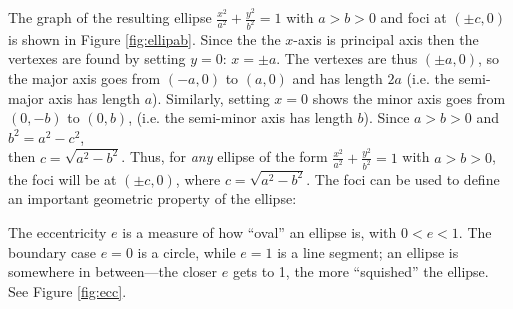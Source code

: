 \piccaption[]{\label{fig:ellipab}}
The graph of the resulting ellipse $\frac{x^2}{a^2} + \frac{y^2}{b^2} = 1$ with
$a>b>0$ and foci at $(\pm c,0)$ is shown in Figure \ref{fig:ellipab}. Since the
the $x$-axis is principal axis then the vertexes are found by setting $y=0$:
$x=\pm a$. The vertexes are thus $(\pm a,0)$, so the major axis goes from
$(-a,0)$ to $(a,0)$ and has length $2a$ (i.e. the semi-major axis has length
$a$). Similarly, setting $x=0$ shows the minor axis goes from $(0,-b)$ to
$(0,b)$, (i.e. the semi-minor axis has length $b$). Since $a>b>0$ and
$b^2 = a^2 - c^2$,\\then $c = \sqrt{a^2 - b^2}$. Thus, for \emph{any} ellipse of
the form $\frac{x^2}{a^2} + \frac{y^2}{b^2} = 1$ with $a>b>0$, the foci will be
at $(\pm c,0)$, where $c = \sqrt{a^2 - b^2}$. The foci can be used to
define an important geometric property of the ellipse:


The eccentricity $e$ is a measure of how ``oval'' an ellipse is, with $0<e<1$.
The boundary case $e=0$ is a circle, while $e=1$ is a line segment; an ellipse
is somewhere in between---the closer $e$ gets to 1, the more ``squished'' the
ellipse. See Figure \ref{fig:ecc}.

